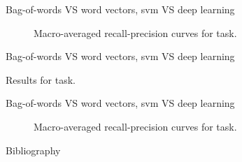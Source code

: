 \begin{frame}{Bag-of-words VS word vectors, \acs{svm} VS deep learning}
\begin{figure}
  \centering
  \resizebox{0.9\textwidth}{!}{}
  \caption{Macro-averaged recall-precision curves for \type{} task.}
\end{figure}

\end{frame}

\begin{frame}{Bag-of-words VS word vectors, \acs{svm} VS deep learning}
\begin{table}
  \centering
  \caption{Results for \behaviour{} task.}
  \footnotesize
  
\end{table}
\end{frame}

\begin{frame}{Bag-of-words VS word vectors, \acs{svm} VS deep learning}
\begin{figure}
  \centering
  \resizebox{0.9\textwidth}{!}{}
  \caption{Macro-averaged recall-precision curves for \behaviour{} task.}
\end{figure}

\end{frame}

\begin{frame}[allowframebreaks]{Bibliography}
  \scriptsize
  

\end{frame}


\backupend



